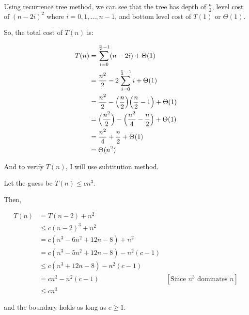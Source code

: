 \documentclass[12pt]{article}
\begin{document}
\begin{enumerate}[1.]
\begin{enumerate}[a)]
        \bigskip

        Using recurrence tree method, we can see that the tree has depth of $\frac{n}{2}$,
        level cost of $(n-2i)^2$ where $i = 0,1,...,n-1$, and bottom level cost
        of $T(1)$ or $\Theta(1)$.

        \bigskip

        So, the total cost of $T(n)$ is:

        \begin{align}
            T(n) &= \sum\limits_{i=0}^{\frac{n}{2} - 1} (n - 2i) + \Theta(1)\\
            &= \frac{n^2}{2} - 2 \sum\limits_{i = 0}^{\frac{n}{2} - 1} i + \Theta(1)\\
            &= \frac{n^2}{2} - \Bigl(\frac{n}{2} \Bigr)\Bigl( \frac{n}{2} - 1 \Bigr) + \Theta(1)\\
            &= \Bigl( \frac{n^2}{2} \Bigr) - \Bigl( \frac{n^2}{4} - \frac{n}{2} \Bigr) + \Theta(1)\\
            &= \frac{n^2}{4} + \frac{n}{2} + \Theta(1)\\
            &= \Theta(n^2)
        \end{align}

        \bigskip

        And to verify $T(n)$, I will use subtitution method.

        \bigskip

        Let the guess be $T(n) \leq cn^3$.

        \bigskip

        Then,

        \begin{align}
            T(n) &= T(n-2) + n^2\\
            &\leq c(n-2)^3 + n^2\\
            &= c (n^3 - 6n^2 + 12n - 8) + n^2\\
            &= c (n^3 - 5n^2 + 12n - 8) - n^2 (c - 1)\\
            &\leq c (n^3 + 12n - 8) - n^2 (c - 1)\\
            &= cn^3 - n^2 (c - 1) & [\text{Since $n^3$ dominates $n$}]\\
            &\leq cn^3
        \end{align}

        \bigskip

        and the boundary holds as long as $c \geq 1$.


    \end{enumerate}


\end{enumerate}
\end{document}

